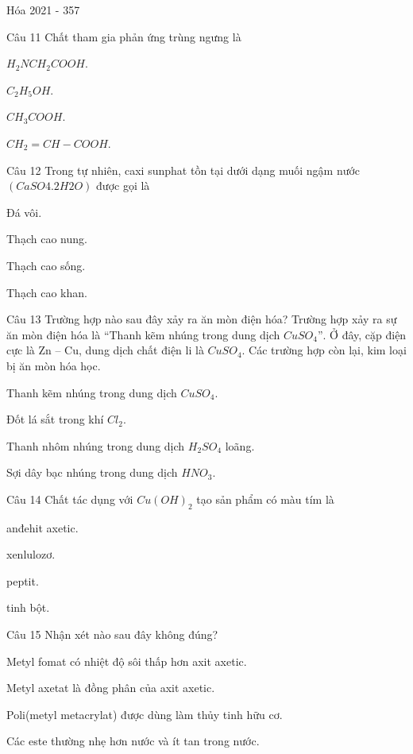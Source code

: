 \documentclass{book}
\begin{document}
\begin{quiz}{Hóa 2021 - 357}
\begin{multi}[points=1]{Câu 11}
 Chất tham gia phản ứng trùng ngưng là

\item*  $H_2NCH_2COOH$.	
\item  $C_2H_5OH$.	
\item  $CH_3COOH$.	
\item  $CH_2=CH-COOH$.
\end{multi}

\begin{multi}[points=1]{Câu 12}
 Trong tự nhiên, caxi sunphat tồn tại dưới dạng muối ngậm nước $(CaSO4.2H2O)$ được gọi là

\item  Đá vôi.	
\item  Thạch cao nung.	
\item*  Thạch cao sống.	
\item  Thạch cao khan.
\end{multi}

\begin{multi}[points=1]{Câu 13}
 Trường hợp nào sau đây xảy ra ăn mòn điện hóa? 
Trường hợp xảy ra sự ăn mòn điện hóa là “Thanh kẽm nhúng trong dung dịch $CuSO_4”$. Ở đây, cặp điện cực là Zn – Cu, dung dịch chất điện li là $CuSO_4$. Các trường hợp còn lại, kim loại bị ăn mòn hóa học. 

\item*  Thanh kẽm nhúng trong dung dịch $CuSO_4$.	
\item  Đốt lá sắt trong khí $Cl_2$.	
\item  Thanh nhôm nhúng trong dung dịch $H_2SO_4$ loãng.	
\item  Sợi dây bạc nhúng trong dung dịch $HNO_3$.
\end{multi}

\begin{multi}[points=1]{Câu 14}
 Chất tác dụng với $Cu(OH)_2$ tạo sản phẩm có màu tím là

\item  anđehit axetic.	
\item  xenlulozơ.	
\item*  peptit.	
\item  tinh bột.
\end{multi}

\begin{multi}[points=1]{Câu 15}
 Nhận xét nào sau đây không đúng? 

\item  Metyl fomat có nhiệt độ sôi thấp hơn axit axetic.	
\item*  Metyl axetat là đồng phân của axit axetic.	
\item  Poli(metyl metacrylat) được dùng làm thủy tinh hữu cơ.	
\item  Các este thường nhẹ hơn nước và ít tan trong nước.
\end{multi}


\end{quiz}
\end{document}
